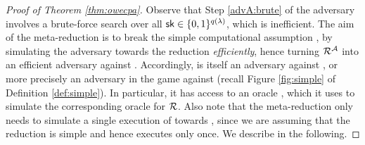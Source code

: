 \begin{proof}[Proof of Theorem \ref{thm:owecpa}]
  Observe that Step \ref{advA:brute} of the adversary \advA involves a brute-force search
  over all \(\mathsf{sk} \in \{0,1\}^{q(\lambda)}\), which is inefficient.
  The aim of the meta-reduction \redM is to break the simple computational assumption \Simple,
  by simulating the adversary \advA towards the reduction \redR \emph{efficiently},
  hence turning \(\redR^{\advA}\) into an efficient adversary against \Simple.
  Accordingly, \redM is itself an adversary against \Simple,
  or more precisely an adversary in the game \SICA against \Simple
  (recall Figure \ref{fig:simple} of Definition \ref{def:simple}).
  In particular, it has access to an oracle \oracle,
  which it uses to simulate the corresponding oracle for \(\redR\).
  Also note that the meta-reduction \redM only needs to simulate a single
  execution of \advA towards \redR,
  since we are assuming that the reduction \redR is simple
  and hence executes \advA only once.
  We describe \redM in the following.


\end{proof}
